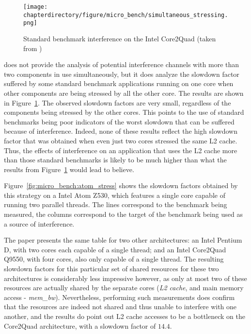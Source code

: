 \begin{figure}[hbt!]
\begin{center}
\texttt{[image: \\chapterdirectory/figure/micro\_bench/simultaneous\_stressing.png]}
\end{center}
\caption{Standard benchmark interference on the Intel Core2Quad (taken
from \cite{10.1145/2086696.2086713})}%
\label{fig:micro_bench:core2quad_max_interference}
\end{figure}

\cite{10.1145/2086696.2086713} does not provide the analysis of potential
interference channels with more than two components in use simultaneously, but
it does analyze the slowdown factor suffered by some standard benchmark
applications running on one core when other components are being stressed by all
the other core.
The results are shown in
Figure~\ref{fig:micro_bench:core2quad_max_interference}. The observed slowdown
factors are very small, regardless of the components being stressed by the other
cores. This points to the use of standard benchmarks being poor indicators of
the worst slowdown that can be suffered because of interference. Indeed, none of
these results reflect the high slowdown factor that was obtained when even just
two cores stressed the same L2 cache. Thus, the effects of interference on an
application that uses the L2 cache more than those standard benchmarks is likely
to be much higher than what the results from
Figure~\ref{fig:micro_bench:core2quad_max_interference} would lead to believe.

\iffalse %
Figure~\ref{fig:micro_bench:atom_stress} shows the slowdown factors obtained by
this strategy on a Intel Atom Z530, which features a single core capable of
running two parallel threads. The lines correspond to the benchmark being
measured, the columns correspond to the target of the benchmark being used as
a source of interference.

The paper presents the same table for two other architectures: an Intel Pentium
D, with two cores each capable of a single thread; and an Intel Core2Quad
Q9550, with four cores, also only capable of a single thread. The resulting
slowdown factors for this particular set of shared resources for these two
architectures is considerably less impressive however, as only at most
two of these resources are actually shared by the separate cores (\textit{L2
cache}, and main memory access - \textit{mem\_bw}). Nevertheless, performing
such measurements does confirm that the resources are indeed not shared and
thus unable to interfere with one another, and the results do point out
L2 cache accesses to be a bottleneck on the Core2Quad architecture, with a
slowdown factor of $14.4$.

